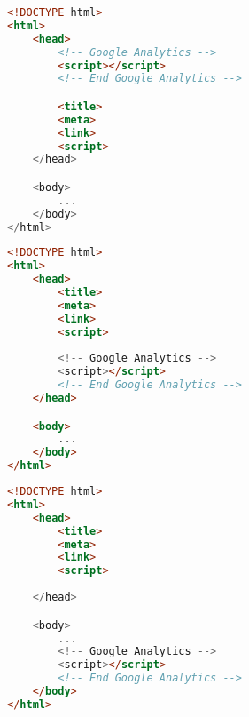 

\begin{sidewaysfigure}
\begin{multicols}{3}
\begin{center}
\begin{lstlisting}[caption={Position 1}, language=html, numbers=none]
<!DOCTYPE html>
<html>
    <head>
        <!-- Google Analytics -->
        <script></script>
        <!-- End Google Analytics -->

        <title>
        <meta>
        <link>
        <script>
    </head>

    <body>
        ...
    </body>
</html>
\end{lstlisting}
\end{center}

\columnbreak

\begin{center}
\begin{lstlisting}[caption={Position 2}, language=html, numbers=none]
<!DOCTYPE html>
<html>
    <head>
        <title>
        <meta>
        <link>
        <script>
        
        <!-- Google Analytics -->
        <script></script>
        <!-- End Google Analytics -->
    </head>

    <body>
        ...
    </body>
</html>
\end{lstlisting}
\end{center}

\columnbreak

\begin{center}
\begin{lstlisting}[caption={Position 3}, language=html, numbers=none]
<!DOCTYPE html>
<html>
    <head>
        <title>
        <meta>
        <link>
        <script>
        
    </head>

    <body>
        ...
        <!-- Google Analytics -->
        <script></script>
        <!-- End Google Analytics -->
    </body>
</html>
\end{lstlisting}
\end{center}
\end{multicols}
\end{sidewaysfigure}



